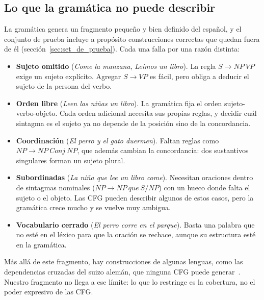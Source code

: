 \subsection{Lo que la gramática no puede describir}

La gramática genera un fragmento pequeño y bien definido del español, y el conjunto de prueba
incluye a propósito construcciones correctas que quedan fuera de él
(sección~\ref{sec:set_de_prueba}). Cada una falla por una razón distinta:
\begin{itemize}
  \item \textbf{Sujeto omitido} (\emph{Come la manzana}, \emph{Leímos un libro}). La regla
    $S \to NP\ VP$ exige un sujeto explícito. Agregar $S \to VP$ es fácil, pero obliga a
    deducir el sujeto de la persona del verbo.
  \item \textbf{Orden libre} (\emph{Leen las niñas un libro}). La gramática fija el orden
    sujeto-verbo-objeto. Cada orden adicional necesita sus propias reglas, y decidir cuál
    sintagma es el sujeto ya no depende de la posición sino de la concordancia.
  \item \textbf{Coordinación} (\emph{El perro y el gato duermen}). Faltan reglas como
    $NP \to NP\ \textit{Conj}\ NP$, que además cambian la concordancia: dos sustantivos
    singulares forman un sujeto plural.
  \item \textbf{Subordinadas} (\emph{La niña que lee un libro come}). Necesitan oraciones dentro
    de sintagmas nominales ($NP \to NP\ \textit{que}\ S/NP$) con un hueco donde falta el sujeto o
    el objeto. Las CFG pueden describir algunos de estos casos, pero la gramática crece mucho y
    se vuelve muy ambigua.
  \item \textbf{Vocabulario cerrado} (\emph{El perro corre en el parque}). Basta una palabra que
    no esté en el léxico para que la oración se rechace, aunque su estructura esté en la
    gramática.
\end{itemize}
Más allá de este fragmento, hay construcciones de algunas lenguas, como las dependencias
cruzadas del suizo alemán, que ninguna CFG puede generar~\cite{shieber}. Nuestro fragmento no
llega a ese límite: lo que lo restringe es la cobertura, no el poder expresivo de las CFG.
